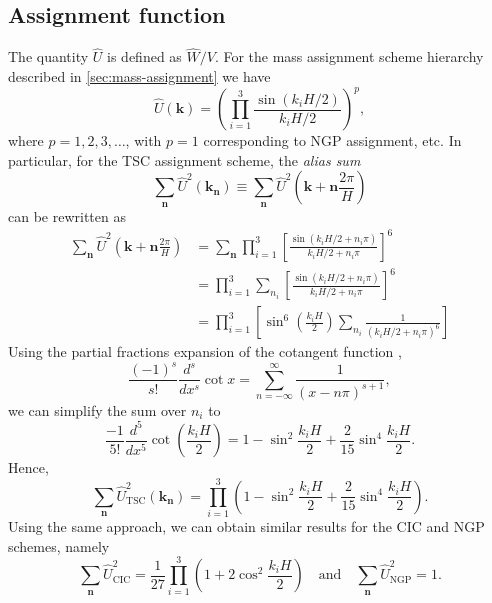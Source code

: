 \subsection{Assignment function}
The quantity $\hat{U}$ is defined as $\hat{W}/V$.
For the mass assignment scheme hierarchy described in \autoref{sec:mass-assignment} we have
\begin{equation*}
    \hat{U}(\mathbf{k}) = \left(\prod_{i=1}^{3}\frac{\sin(k_i H / 2)}{k_i H / 2}\right)^{p},
\end{equation*}
where $p=1,2,3,\dots$, with $p=1$ corresponding to NGP assignment, etc.
In particular, for the TSC assignment scheme, the \textit{alias sum}
\begin{equation*}
    \sum_{\mathbf{n}}\hat{U}^2(\mathbf{k}_\mathbf{n})
    \equiv \sum_{\mathbf{n}}\hat{U}^2\left(\mathbf{k} + \mathbf{n}\frac{2\pi}{H}\right)
\end{equation*}
can be rewritten as
\begin{align*}
    \sum_{\mathbf{n}} \hat{U}^2\left(\mathbf{k}+\mathbf{n}\frac{2\pi}{H}\right)
     & = \sum_{\mathbf{n}} \prod_{i=1}^{3} \left[ \frac{\sin(k_i H/2 + n_i\pi)}{k_i H/2 + n_i\pi} \right]^6 \\
     & = \prod_{i=1}^{3} \sum_{n_i} \left[ \frac{\sin(k_i H/2 + n_i \pi)}{k_i H/2 + n_i \pi} \right]^6      \\
     & = \prod_{i=1}^{3} \left[ \sin^6\left(\frac{k_i H}{2}\right)
        \sum_{n_i} \frac{1}{(k_i H/2 + n_i \pi)^6} \right]
\end{align*}
Using the partial fractions expansion of the cotangent function \cite{aigner2018proofs},
\begin{equation*}
    \frac{(-1)^s}{s!}\frac{d^s}{dx^s}\cot x = \sum_{n=-\infty}^{\infty} \frac{1}{(x-n\pi)^{s+1}},
\end{equation*}
we can simplify the sum over $n_i$ to
\begin{equation*}
    \frac{-1}{5!} \frac{d^5}{dx^5}\cot\left( \frac{k_i H}{2} \right)
    = 1 - \sin^2\frac{k_i H}{2} + \frac{2}{15}\sin^4\frac{k_i H}{2}.
\end{equation*}
Hence,
\begin{equation*}
    \sum_{\mathbf{n}}\hat{U}_\text{TSC}^2(\mathbf{k}_\mathbf{n})
    = \prod_{i=1}^{3} \left(1 - \sin^2\frac{k_i H}{2} + \frac{2}{15}\sin^4\frac{k_i H}{2}\right).
\end{equation*}
Using the same approach, we can obtain similar results for the CIC and NGP schemes, namely
\begin{equation*}
    \sum_{\mathbf{n}}\hat{U}_\text{CIC}^2 = \frac{1}{27} \prod_{i=1}^{3} \left(1 + 2\cos^2\frac{k_i H}{2}\right)
    \quad \text{and} \quad
    \sum_{\mathbf{n}}\hat{U}_\text{NGP}^2 = 1.
\end{equation*}

